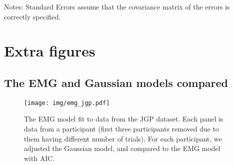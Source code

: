 \documentclass{article}
\begin{document}
Notes: \newline
[1] Standard Errors assume that the covariance matrix of the errors is correctly specified.

\section{Extra figures}
\subsection{The EMG and Gaussian models compared}
\begin{figure}[h]
    \centering
    \texttt{[image: img/emg\_jgp.pdf]}
    \caption{The EMG model fit to data from the JGP dataset. Each panel is data from a participant (first three participants removed due to them having different number of trials). For each participant, we adjusted the Gaussian model, and compared to the EMG model with AIC.}

\end{figure}
\end{document}
